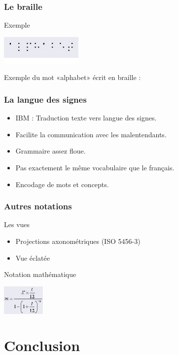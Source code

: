 \documentclass{beamer}
\begin{document}
\begin{frame}  
  \frametitle{Le braille}
  \begin{block}{Exemple}
  \begin{center}
  \includegraphics[width=4cm]{./include/braille_alphabet.jpg}
  \end{center}
  Exemple du mot «alphabet» écrit en braille :
  \end{block}
\end{frame}


\begin{frame}  
  \frametitle{La langue des signes}
  \begin{itemize}
  \item IBM : Traduction texte vers langue des signes.
  \item Facilite la communication avec les malentendants.
  \item Grammaire assez floue.
  \item Pas exactement le même vocabulaire que le français.
  \item Encodage de mots et concepts.
  \end{itemize}
\end{frame}

\begin{frame}  
  \frametitle {Autres notations}
  \begin{block}{Les vues}
  \begin{itemize}
  \item Projections axonométriques (ISO 5456-3)
  \item Vue éclatée
  \end{itemize}
  \end{block}
  \begin{block}{Notation mathématique}
  \begin{center}
  \includegraphics[height=1.5cm]{./include/formule.jpg}
  \end{center}
  \end{block}
\end{frame}

\section{Conclusion}
\end{document}
